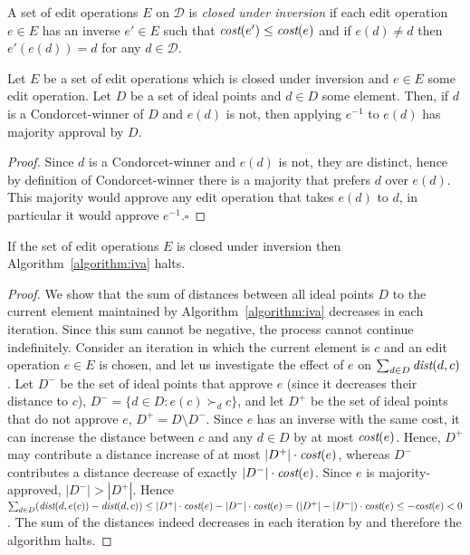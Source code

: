 \documentclass[sigconf]{aamas}  %
\newcommand{\qqed}{\hfill$\square$}
\newcommand{\calD}{\mathcal{D}}
\newcommand{\prefers}[1]{\succ_{#1}}
\newcommand{\dist}{\emph{dist}}
\newcommand{\cost}{\emph{cost}}
\begin{document}
\begin{definition}
%
A set of edit operations $E$ on $\calD$ is \emph{closed under inversion} if each edit operation $e \in E$ has an inverse $e' \in E$ such that $\cost(e') \leq \cost(e)$ and if $e(d) \ne d$ then $e'(e(d)) = d$ for any $d \in \calD$.
%
\end{definition}

\begin{lemma}\label{lemma:inverse}
Let $E$ be a set of edit operations which is closed under inversion and $e \in E$ some edit operation.
Let $D$ be a set of ideal points and $d \in D$ some element.
Then, if $d$ is a Condorcet-winner of $D$ and $e(d)$ is not,
then applying $e^{-1}$ to $e(d)$ has majority approval by $D$.
\end{lemma}

\begin{proof}
%
Since $d$ is a Condorcet-winner and $e(d)$ is not, they are distinct, hence by definition of Condorcet-winner there is a majority that prefers $d$ over $e(d)$.  This majority would approve any edit operation that takes $e(d)$ to $d$, in particular it would approve $e^{-1}$.\qqed
%
\end{proof}

\begin{lemma}\label{lemma:stops}
If the set of edit operations $E$ is closed under inversion then Algorithm~\ref{algorithm:iva} halts.
\end{lemma}

\begin{proof}
%
We show that the sum of distances between all ideal points $D$ to the current element maintained by Algorithm~\ref{algorithm:iva} decreases in each iteration. Since this sum cannot be negative, the process cannot continue indefinitely. Consider an iteration in which the current element is $c$ and an edit operation $e \in E$ is chosen, and let us investigate the effect of $e$ on $\sum_{d \in D} \dist(d, c)$.
%
Let $D^-$ be the set of ideal points that approve $e$ (since it decreases their distance to $c$), $D^- = \{d \in D: e(c) \prefers{d} c\}$,  and let $D^+$ be the set of ideal points that do not approve $e$, $D^+ = D \setminus D^-$. Since $e$ has an inverse with the same cost, it can increase the distance between $c$ and any $d \in D$ by at most $\cost(e)$.
Hence,  $D^+$ may contribute a distance increase of at most $|D^+| \cdot \cost(e)$, whereas  $D^-$  contributes a distance decrease of exactly $|D^-| \cdot \cost(e)$. 
Since $e$ is majority-approved, $|D^-| > |D^+|$.   Hence  $\sum_{d \in D} (\dist(d, e(c)) -\dist(d,c)) \le |D^+| \cdot \cost(e) -  |D^-| \cdot \cost(e)  = (|D^+| - |D^-|) \cdot \cost(e) \le  -\cost(e) < 0$.  The sum of the distances indeed decreases in each iteration by and therefore the algorithm halts.
%
\end{proof}
\end{document}
